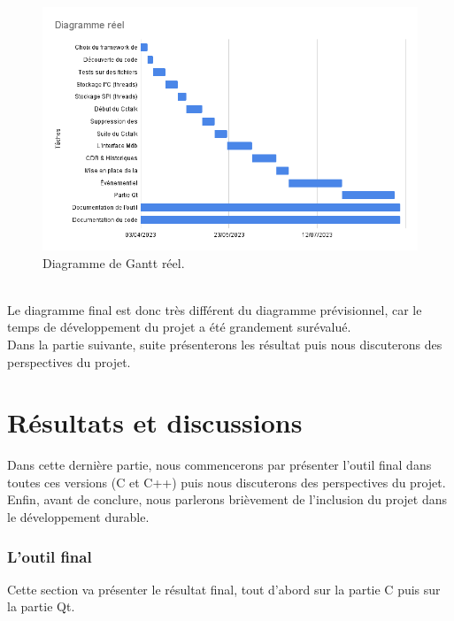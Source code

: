 \documentclass[a4paper]{article}
\begin{document}
\begin{figure}[h!]
  \begin{center}
  \includegraphics[scale=0.6]{./img/diagramme-reel.png}
  \caption{Diagramme de Gantt réel.}
    \label{fig:finalgantt}
  \end{center}
\end{figure}~\\

Le diagramme final est donc très différent du diagramme prévisionnel, car le
temps de développement du projet a été grandement surévalué.\\

Dans la partie suivante, suite présenterons les résultat puis nous discuterons
des perspectives du projet.
\clearpage
\part{Résultats et discussions}

Dans cette dernière partie, nous commencerons par présenter l'outil final dans
toutes ces versions (C et C++) puis nous discuterons des perspectives du projet.
Enfin, avant de conclure, nous parlerons brièvement de l'inclusion du projet
dans le développement durable.

\section{L'outil final}%

Cette section va présenter le résultat final, tout d'abord sur la partie C puis
sur la partie Qt.\\
\end{document}
